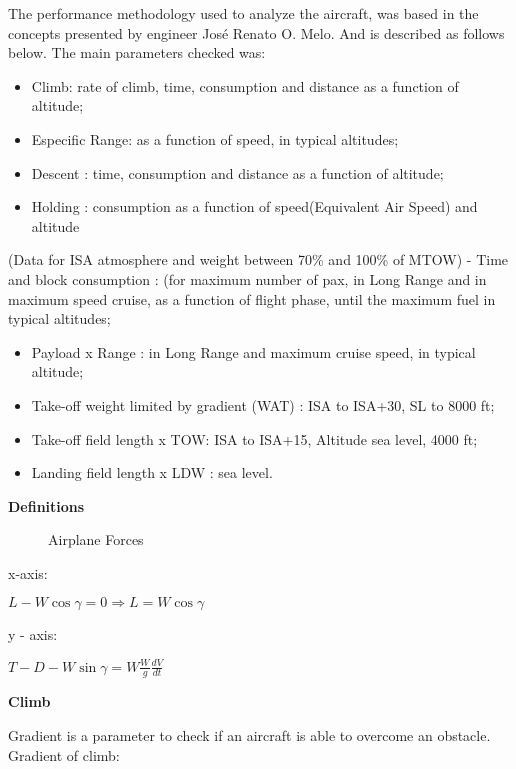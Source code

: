 ﻿The performance methodology used to analyze the aircraft, was based in the concepts presented by engineer José Renato O. Melo. And is described as follows below.
	The main parameters checked was:

\begin{itemize}
  \item Climb: rate of climb, time, consumption and distance as a function of altitude;
  \item Especific Range: as a function of speed, in typical altitudes;
  \item Descent : time, consumption and distance as a function of altitude;
  \item Holding : consumption as a function of speed(Equivalent Air Speed) and altitude
\end{itemize}


       (Data for ISA atmosphere and weight  between 70\% and 100\% of MTOW)
- Time and block consumption :
(for maximum number of pax, in Long Range and in maximum speed cruise, as a function of flight phase, until the maximum fuel in typical altitudes;

\begin{itemize}
  \item Payload x Range : in Long Range and maximum cruise speed, in typical  altitude;
  \item Take-off weight limited by gradient (WAT) : ISA to ISA+30, SL to 8000 ft;
  \item Take-off field length x TOW: ISA to ISA+15, Altitude sea level, 4000 ft;
  \item Landing field length x LDW :  sea level.
\end{itemize}


\textbf{Definitions}

\begin{figure}[H] %
\caption{Airplane Forces}
\label{fig:forces}
\end{figure}

x-axis:

$L-W\cos\gamma = 0 \Rightarrow L = W\cos\gamma$

y - axis:

$T - D - W\sin\gamma = W \frac{W}{g} \frac{dV}{dt} $


\textbf{Climb}

Gradient is a parameter to check if an aircraft is able to overcome an obstacle. Gradient of climb:


